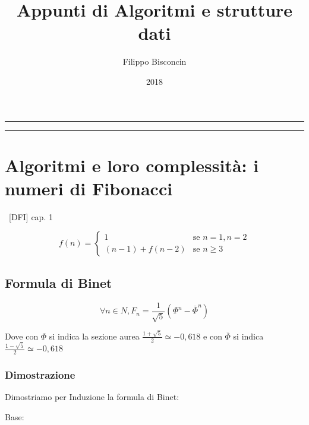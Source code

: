 \documentclass[tikz]{article}
\title{Appunti di Algoritmi e strutture dati}
\author{Filippo Bisconcin}
\date{2018}
\begin{document}
\begin{titlepage}
\maketitle
\end{titlepage}

\begin{center}\rule{0.5\linewidth}{\linethickness}\end{center}

\tableofcontents

\begin{center}\rule{0.5\linewidth}{\linethickness}\end{center}

\section{Algoritmi e loro complessità: i numeri di Fibonacci}

{~{[}DFI{]} cap. 1}

\begin{equation}
f(n) = 
\begin{cases}
1 & \mbox{se } n=1,n=2 \\ 
(n-1)+f(n-2) & \mbox{se } n\geq3 
\end{cases}
\end{equation}

\subsection{Formula di Binet}

\begin{equation}
\forall n \in N, F_n = \frac{1}{\sqrt{5}}(\Phi^n-\overline{\Phi}^n)
\end{equation}

Dove con $\Phi$ si indica la sezione aurea $\frac{1+\sqrt{5}}{2} \simeq -0,618$ e con $\overline{\Phi}$ si indica $\frac{1-\sqrt{5}}{2} \simeq -0,618$

\subsubsection{Dimostrazione}

{Dimostriamo per Induzione la formula di Binet:}

{Base:}
\end{document}
